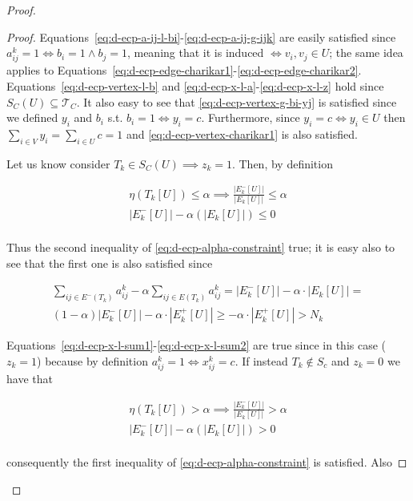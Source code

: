 \begin{proof}
\begin{proof}
		Equations~\ref{eq:d-ecp-a-ij-l-bi}-\ref{eq:d-ecp-a-ij-g-ijk} are easily
		satisfied since $a_{ij}^{k} = 1 \iff b_i = 1 \land b_j = 1$, meaning
		that it is induced $\iff v_i, v_j \in U$; the same idea applies to
		Equations~\ref{eq:d-ecp-edge-charikar1}-\ref{eq:d-ecp-edge-charikar2}.
		Equations~\ref{eq:d-ecp-vertex-l-b} and
		\ref{eq:d-ecp-x-l-a}-\ref{eq:d-ecp-x-l-z} hold since
		$S_C(U) \subseteq \mathcal{T}_C $. It also easy to see that
		\autoref{eq:d-ecp-vertex-g-bi-yj} is satisfied since we defined $y_i$
		and $b_i$ s.t. $b_i = 1 \iff y_i = c$. Furthermore, since $y_i = c \iff
			y_i \in U$ then $ \sum^{}_{i \in V} y_i = \sum^{}_{i \in U} c = 1$
		and \autoref{eq:d-ecp-vertex-charikar1} is also satisfied.

		Let us know consider $T_k \in S_C(U) \implies z_k = 1$. Then, by definition

		\begin{gather}
			\eta(T_k[U]) \leq \alpha \implies
			\frac{|E^{-}_{k}[U]|}{|E_{k}[U]|} \leq \alpha \\
			|E^{-}_{k}[U]| - \alpha (|E_{k}[U]|) \leq 0 \\
		\end{gather}

		Thus the second inequality of \autoref{eq:d-ecp-alpha-constraint} true;
		it is easy also to see that the first one is also satisfied since

		\begin{multline}
			\sum^{}_{ij \in E^{-} (T_k)} a_{ij}^{k}  - \alpha \sum^{}_{ij \in E(T_k)}
			a_{ij} ^{k} = |E^{-}_{k}[U]| - \alpha \cdot |E_{k}[U]| = \\
			(1- \alpha)|E^{-}_{k}[U]| - \alpha \cdot |E^{+}_{k}[U]| \geq -
			\alpha \cdot |E^{+}_{k}[U]| > N_k
		\end{multline}

		Equations~\ref{eq:d-ecp-x-l-sum1}-\ref{eq:d-ecp-x-l-sum2} are true
		since in this case ($z_k = 1$) because by definition $a_{ij}^{k} = 1
			\iff x_{ij}^{k} = c$. If instead $T_k \not\in S_c$ and $z_k = 0$ we
		have that

		\begin{gather}
			\eta(T_k[U]) > \alpha \implies
			\frac{|E^{-}_{k}[U]|}{|E_{k}[U]|} > \alpha \\
			|E^{-}_{k}[U]| - \alpha (|E_{k}[U]|) > 0 \\
		\end{gather}

		consequently the first inequality of
		\autoref{eq:d-ecp-alpha-constraint} is satisfied. Also


\end{proof}
\end{proof}
